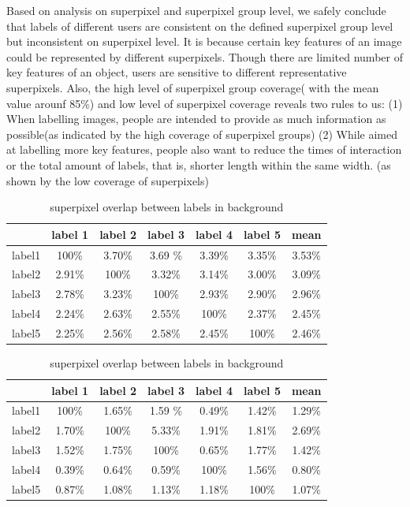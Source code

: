 \documentclass[runningheads,a4paper]{llncs}
\begin{document}
Based on analysis on superpixel and superpixel group level, we safely conclude that labels of different users are consistent on the defined superpixel group level but inconsistent on superpixel level. It is because certain key features of an image could be represented by different superpixels. Though there are limited number of key features of an object, users are sensitive to different representative superpixels. Also, the high level of superpixel group coverage( with the mean value arounf 85\%) and low level of superpixel coverage reveals two rules to us: (1) When labelling images, people are intended to provide as much information as possible(as indicated by the high coverage of superpixel groups)  (2) While aimed at labelling more key features, people also want to reduce the times of interaction or the total amount of labels, that is, shorter length within the same width. (as shown by the low coverage of superpixels)




\begin{table}
\parbox{.35\linewidth}{
\centering
\begin{tabular}{|c|c|c|c|c|c|c|}
\hline
 & label 1 & label 2&label 3&label 4&label 5&mean\\
\hline
label1& 100\% & 3.70\% & 3.69	\%& 3.39\%& 3.35\%& 3.53\%\\
\hline
label2& 2.91\% & 100\% & 3.32\%& 3.14\%& 3.00\% & 3.09\%\\
\hline
label3& 2.78\% & 3.23\% & 100\%& 2.93\%& 2.90\%& 2.96\% \\
\hline
label4& 2.24\% & 2.63\% & 2.55\%& 100\%& 2.37\%& 2.45\%\\
\hline
label5& 2.25\% & 2.56\% & 2.58\%& 2.45\%& 100\%& 2.46\% \\
\hline
\end{tabular}
\captionsetup{justification=centerlast}
\caption{superpixel overlap between labels in foreground}
\label{ta: sp overlap f}
}
\hfill
\parbox{.35\linewidth}{
\centering
\begin{tabular}{|c|c|c|c|c|c|c|}
\hline
 & label 1 & label 2&label 3&label 4&label 5&mean\\
\hline
label1& 100\% & 1.65\% & 1.59	\%& 0.49\%& 1.42\%& 1.29\%\\
\hline
label2& 1.70\% & 100\% & 5.33\%& 1.91\%& 1.81\%& 2.69\% \\
\hline
label3& 1.52\% & 1.75\% & 100\%& 0.65\%& 1.77\%& 1.42\% \\
\hline
label4& 0.39\% & 0.64\% & 0.59\%& 100\%& 1.56\%& 0.80\%\\
\hline
label5& 0.87\% & 1.08\% & 1.13\%& 1.18\%& 100\%& 1.07\% \\
\hline
\end{tabular}
\captionsetup{justification=centerlast}
\caption{superpixel overlap between labels in background}
\label{ta: sp overlap b}
}
\label{ta: sp overlap}
\end{table}
\end{document}
